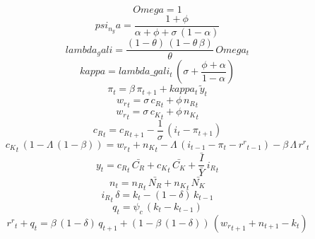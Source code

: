 \documentclass[10pt,a4paper]{article}
\begin{document}
\footnotesize
\begin{dmath*}
Omega = 1
\end{dmath*}
\begin{dmath*}
psi_n_ya = \frac{1+{\phi}}{{\alpha}+{\phi}+{\sigma}\, \left(1-{\alpha}\right)}
\end{dmath*}
\begin{dmath*}
lambda_gali = \frac{\left(1-{\theta}\right)\, \left(1-{\theta}\, {\beta}\right)}{{\theta}}\, Omega_{t}
\end{dmath*}
\begin{dmath*}
kappa = lambda\_gali_{t}\, \left({\sigma}+\frac{{\phi}+{\alpha}}{1-{\alpha}}\right)
\end{dmath*}
\begin{dmath}
{\pi}_{t}={\beta}\, {\pi}_{t+1}+kappa_{t}\, {\tilde y}_{t}
\end{dmath}
\begin{dmath}
{w_r}_{t}={\sigma}\, {c_R}_{t}+{\phi}\, {n_R}_{t}
\end{dmath}
\begin{dmath}
{w_r}_{t}={\sigma}\, {c_K}_{t}+{\phi}\, {n_K}_{t}
\end{dmath}
\begin{dmath}
{c_R}_{t}={c_R}_{t+1}-\frac{1}{{\sigma}}\, \left({i}_{t}-{\pi}_{t+1}\right)
\end{dmath}
\begin{dmath}
{c_K}_{t}\, \left(1-{\Lambda}\, \left(1-{\beta}\right)\right)={w_r}_{t}+{n_K}_{t}-{\Lambda}\, \left({i}_{t-1}-{\pi}_{t}-{r^r}_{t-1}\right)-{\beta}\, {\Lambda}\, {r^r}_{t}
\end{dmath}
\begin{dmath}
{y}_{t}={c_R}_{t}\, \bar{C_R}+{c_K}_{t}\, \bar{C_K}+{\frac{\bar{I}}{\bar{Y}}}\, {i_R}_{t}
\end{dmath}
\begin{dmath}
{n}_{t}={n_R}_{t}\, \bar{N_R}+{n_K}_{t}\, \bar{N_K}
\end{dmath}
\begin{dmath}
{i_R}_{t}\, {\delta}={k}_{t}-\left(1-{\delta}\right)\, {k}_{t-1}
\end{dmath}
\begin{dmath}
{q}_{t}={\psi_c}\, \left({k}_{t}-{k}_{t-1}\right)
\end{dmath}
\begin{dmath}
{r^r}_{t}+{q}_{t}={\beta}\, \left(1-{\delta}\right)\, {q}_{t+1}+\left(1-{\beta}\, \left(1-{\delta}\right)\right)\, \left({w_r}_{t+1}+{n}_{t+1}-{k}_{t}\right)
\end{dmath}
\end{document}
